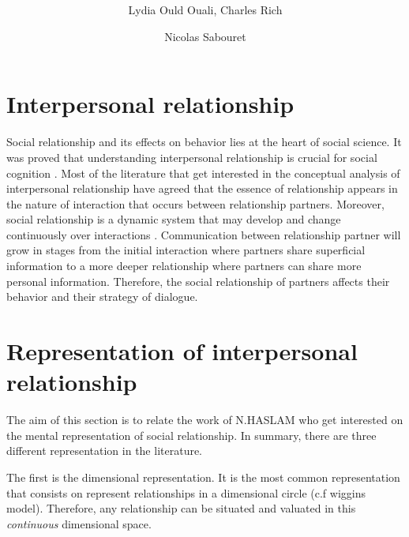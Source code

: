 \documentclass{llncs}
\begin{document}
\title{  \vskip -10pt}

\author{Lydia Ould Ouali, Charles Rich \and
Nicolas Sabouret }

\maketitle 

\section{Interpersonal relationship}
Social relationship and its effects on behavior lies at the heart of social science. It was proved that understanding interpersonal relationship is crucial for social cognition \cite{reis2000relationship}. Most of the literature that get interested in the conceptual analysis of interpersonal relationship have agreed that the essence of relationship appears in the nature of interaction that occurs between relationship partners. Moreover, social relationship is a dynamic system that may develop and change continuously over interactions \cite{reis2000relationship,svennevig2000getting}.
Communication between relationship partner will grow in stages from the initial interaction where partners share superficial information to a more deeper relationship where partners can share more personal information. Therefore, the social relationship of partners affects their behavior and their strategy of dialogue.

\section{Representation of interpersonal relationship}

The aim of this section is to relate the work of N.HASLAM who get interested on the mental representation of social relationship. In summary, there are three different representation in the literature. 
\par The first is the dimensional representation. It is the most common representation that consists on represent relationships in a dimensional circle (c.f wiggins model). Therefore, any relationship can be situated and valuated  in this  \textit{continuous} dimensional space. 
\end{document}
